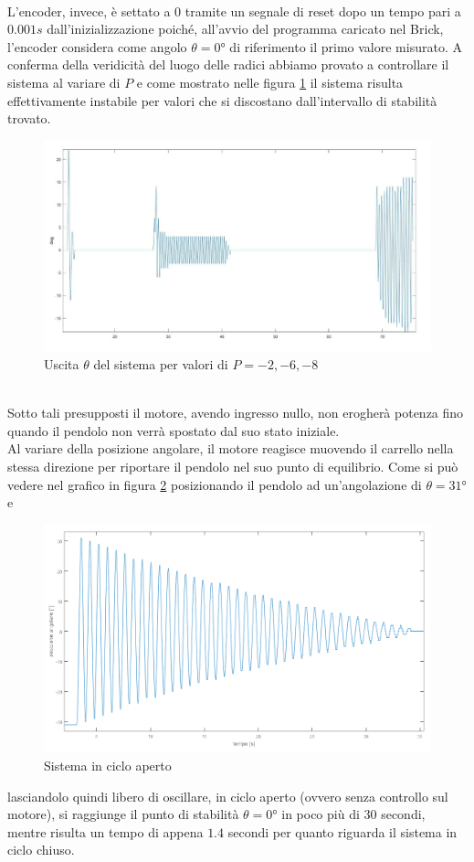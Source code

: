 \\L'encoder, invece, è settato a $0$ tramite un segnale di reset dopo un tempo pari a $0.001s$ dall'inizializzazione poiché, all'avvio del programma caricato nel Brick, l'encoder considera come angolo $\theta=\ang{0}$ di riferimento il primo valore misurato.
\newpage
A conferma della veridicità del luogo delle radici abbiamo provato a controllare il sistema al variare di $P$ e come mostrato nelle figura \ref{variazioneGainP} il sistema risulta effettivamente instabile per valori che si discostano dall'intervallo di stabilità trovato.
\begin{figure}[ht]
	\centering
	\includegraphics[width=\textwidth]{variazioneGainP.jpg}
	\caption{Uscita $\theta$ del sistema per valori di $P=-2,-6,-8$}
	\label{variazioneGainP}
\end{figure}
\\Sotto tali presupposti il motore, avendo ingresso nullo, non erogherà potenza fino quando il pendolo non verrà spostato dal suo stato iniziale.\\
Al variare della posizione angolare, il motore reagisce muovendo il carrello nella stessa direzione per riportare il pendolo nel suo punto di equilibrio.
\newpage
Come si può vedere nel grafico in figura \ref{oscillOL} posizionando il pendolo ad un'angolazione di $\theta=\ang{31}$ e
\begin{figure}[ht]
	\centering
	\includegraphics[scale=0.4]{oscillOL.PNG}
	\caption{Sistema in ciclo aperto}
	\label{oscillOL}
\end{figure}  lasciandolo quindi libero di oscillare, in ciclo aperto (ovvero senza controllo sul motore), si raggiunge il punto di stabilità $\theta=\ang{0}$ in poco più di $30$ secondi, mentre risulta un tempo di appena $1.4$ secondi per quanto riguarda il sistema in ciclo chiuso.
